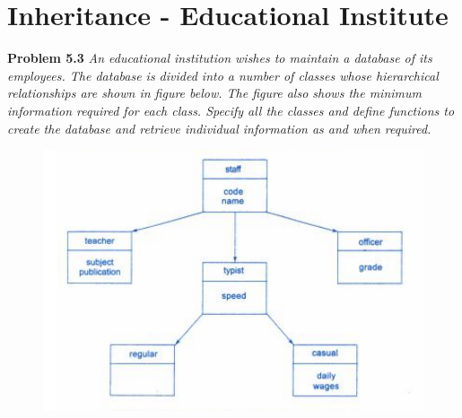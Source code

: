 \documentclass[12pt]{article}
\begin{document}
\section{Inheritance - Educational Institute}
\textbf{Problem 5.3} \textit{An educational institution wishes to maintain a database of its employees. The database is divided into a number of classes whose
hierarchical relationships are shown in figure below. The figure also
shows the minimum information required for each class. Specify all
the classes and define functions to create the database and retrieve
individual information as and when required.}

\begin{center}


\begin{figure}[h!]
  \includegraphics[width=130mm]{cpp_5_3.jpg}
  \label{fig:boat1}
\end{figure}

\end{center}
\end{document}
